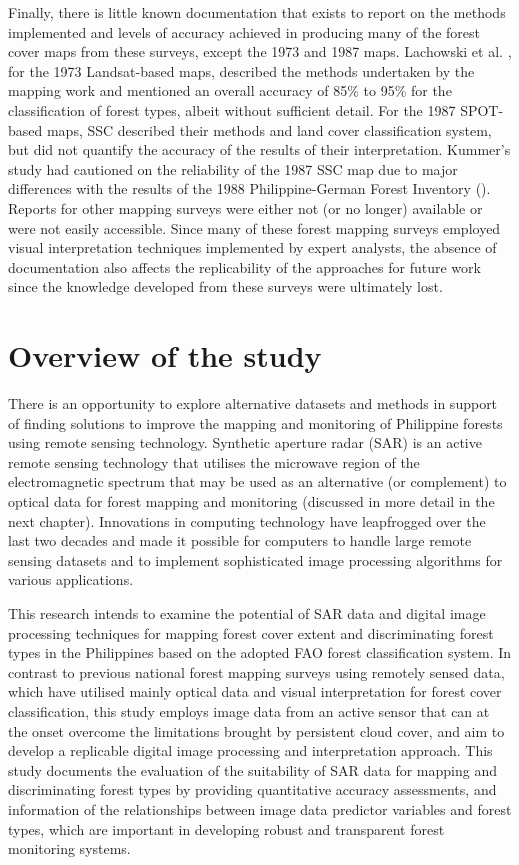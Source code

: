 Finally, there is little known documentation that exists to report on the methods implemented and levels of accuracy achieved in producing many of the forest cover maps from these surveys, except the 1973 and 1987 maps. Lachowski et al. \citeyearpar{lachowski_landsat_1979}, for the 1973 Landsat-based maps, described the methods undertaken by the mapping work and mentioned an overall accuracy of 85\% to 95\% for the classification of forest types, albeit without sufficient detail. For the 1987 SPOT-based maps, SSC \cite{swedish_space_corporation_mapping_1988} described their methods and land cover classification system, but did not quantify the accuracy of the results of their interpretation. Kummer's study had cautioned on the reliability of the 1987 SSC map due to major differences with the results of the 1988 Philippine-German Forest Inventory (\cite{kummer_remote_1992}). Reports for other mapping surveys were either not (or no longer) available or were not easily accessible. Since many of these forest mapping surveys employed visual interpretation techniques implemented by expert analysts, the absence of documentation also affects the replicability of the approaches for future work since the knowledge developed from these surveys were ultimately lost.

\section{Overview of the study}
\label{sec: intro-overview-study}

There is an opportunity to explore alternative datasets and methods in support of finding solutions to improve the mapping and monitoring of Philippine forests using remote sensing technology. Synthetic aperture radar (SAR) is an active remote sensing technology that utilises the microwave region of the electromagnetic spectrum that may be used as an alternative (or complement) to optical data for forest mapping and monitoring (discussed in more detail in the next chapter). Innovations in computing technology have leapfrogged over the last two decades and made it possible for computers to handle large remote sensing datasets and to implement sophisticated image processing algorithms for various applications.

This research intends to examine the potential of SAR data and digital image processing techniques for mapping forest cover extent and discriminating forest types in the Philippines based on the adopted FAO forest classification system. In contrast to previous national forest mapping surveys using remotely sensed data, which have utilised mainly optical data and visual interpretation for forest cover classification, this study employs image data from an active sensor that can at the onset overcome the limitations brought by persistent cloud cover, and aim to develop a replicable digital image processing and interpretation approach. This study documents the evaluation of the suitability of SAR data for mapping and discriminating forest types by providing quantitative accuracy assessments, and information of the relationships between image data predictor variables and forest types, which are important in developing robust and transparent forest monitoring systems.

